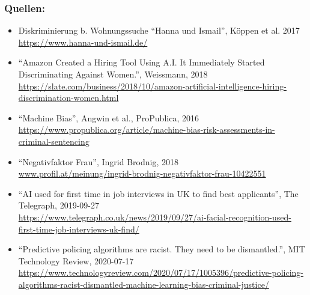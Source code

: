 \documentclass[aspectratio=169,usenames,dvipsnames]{beamer}
\begin{document}
\begin{frame}
\frametitle{Quellen:}
\scriptsize
\begin{itemize}
\item Diskriminierung b. Wohnungssuche ``Hanna und Ismail'', Köppen et al.  2017\\
\url{https://www.hanna-und-ismail.de/}

\item ``Amazon Created a Hiring Tool Using A.I. It Immediately Started Discriminating Against Women.'', Weissmann, 2018\\ \url{https://slate.com/business/2018/10/amazon-artificial-intelligence-hiring-discrimination-women.html}

\item ``Machine Bias'', Angwin et al., ProPublica, 2016\\ \url{https://www.propublica.org/article/machine-bias-risk-assessments-in-criminal-sentencing}

\item ``Negativfaktor Frau'', Ingrid Brodnig, 2018 \\ \url{www.profil.at/meinung/ingrid-brodnig-negativfaktor-frau-10422551}

\item ``AI used for first time in job interviews in UK to find best applicants'', The Telegraph, 2019-09-27 \\ \url{https://www.telegraph.co.uk/news/2019/09/27/ai-facial-recognition-used-first-time-job-interviews-uk-find/}

\item ``Predictive policing algorithms are racist. They need to be dismantled.'', MIT Technology Review, 2020-07-17 \\ \url{https://www.technologyreview.com/2020/07/17/1005396/predictive-policing-algorithms-racist-dismantled-machine-learning-bias-criminal-justice/}

\end{itemize}
\end{frame}
\end{document}
